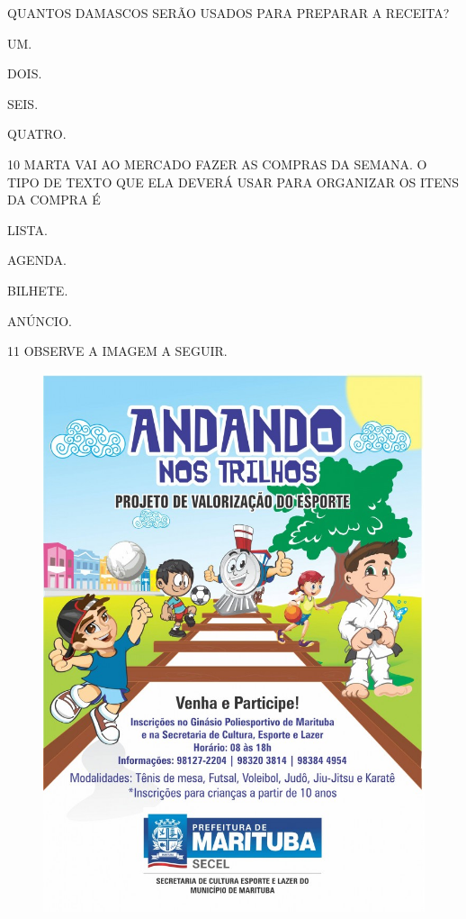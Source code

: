 QUANTOS DAMASCOS SERÃO USADOS PARA PREPARAR A RECEITA?

\begin{escolha}

\item UM.

\item DOIS.

\item SEIS.

\item QUATRO.

\end{escolha}

\num{10} MARTA VAI AO MERCADO FAZER AS COMPRAS DA SEMANA.
O TIPO DE TEXTO QUE ELA DEVERÁ USAR PARA ORGANIZAR OS ITENS DA COMPRA É

\begin{escolha}

\item LISTA.

\item AGENDA.

\item BILHETE.

\item ANÚNCIO.

\end{escolha}

\num{11} OBSERVE A IMAGEM A SEGUIR.

\begin{figure}[H]
\centering
\includegraphics[width=.75\textwidth]{./media/image235.jpg}
\end{figure}

